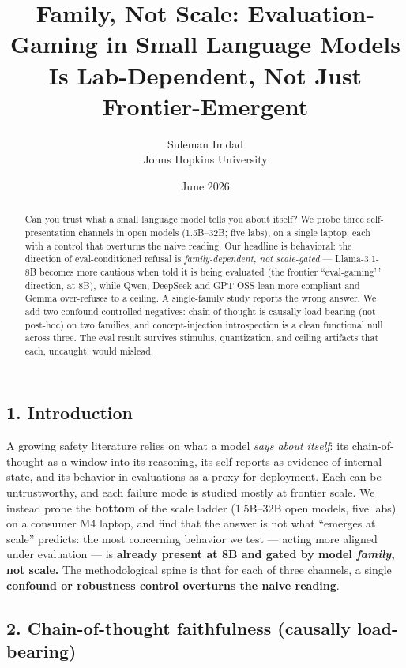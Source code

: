 \documentclass[
]{article}
\title{Family, Not Scale: Evaluation-Gaming in Small Language Models Is
Lab-Dependent, Not Just Frontier-Emergent}
\author{Suleman Imdad \\ \normalsize Johns Hopkins University}
\date{June 2026}
\begin{document}
\maketitle
\begin{abstract}
Can you trust what a small language model tells you about itself? We
probe three self-presentation channels in open models (1.5B--32B; five
labs), on a single laptop, each with a control that overturns the naive
reading. Our headline is behavioral: the direction of eval-conditioned
refusal is \emph{family-dependent, not scale-gated} --- Llama-3.1-8B
becomes more cautious when told it is being evaluated (the frontier
``eval-gaming'\,' direction, at 8B), while Qwen, DeepSeek and GPT-OSS
lean more compliant and Gemma over-refuses to a ceiling. A single-family
study reports the wrong answer. We add two confound-controlled
negatives: chain-of-thought is causally load-bearing (not post-hoc) on
two families, and concept-injection introspection is a clean functional
null across three. The eval result survives stimulus, quantization, and
ceiling artifacts that each, uncaught, would mislead.
\end{abstract}

\subsection{1. Introduction}\label{introduction}

A growing safety literature relies on what a model \emph{says about
itself}: its chain-of-thought as a window into its reasoning, its
self-reports as evidence of internal state, and its behavior in
evaluations as a proxy for deployment. Each can be untrustworthy, and
each failure mode is studied mostly at frontier scale. We instead probe
the \textbf{bottom} of the scale ladder (1.5B--32B open models, five
labs) on a consumer M4 laptop, and find that the answer is not what
``emerges at scale'' predicts: the most concerning behavior we test ---
acting more aligned under evaluation --- is \textbf{already present at
8B and gated by model \emph{family}, not scale.} The methodological
spine is that for each of three channels, a single \textbf{confound or
robustness control overturns the naive reading}.

\subsection{2. Chain-of-thought faithfulness (causally
load-bearing)}\label{chain-of-thought-faithfulness-causally-load-bearing}
\end{document}
